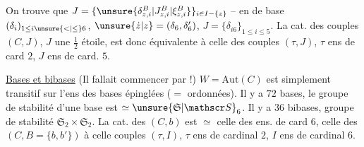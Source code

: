On trouve que $J=\{\unsure{\delta^B_{z,i}|J^B_{z,i}|\xi^B_{z,i}}\}_{i\in I-\{z\}}$ -- en  de base $(\delta_i)_{1\leq i\unsure{<|\leq}6}$, $\unsure{\dot z|z}=(\delta_6,\delta'_6)$, $J=\{\delta_{i6}\}_{1\leq i\leq5}$. La cat. des  couples $(C,J)$, $J$ une $\frac12$ étoile, est donc équivalente à celle des couples $(\tau,J)$, $\tau$ ens de card $2$, $J$ ens de card. $5$.

\uline{Bases et bibases} (Il fallait commencer par !)
$W=\mathrm{Aut}(C)$ est simplement transitif sur l'ens des bases épinglées ($=$ ordonnées). Il y a $72$ bases, le groupe de stabilité d'une base est $\simeq\unsure{\mathfrak S|\mathscr S}_6$. Il y a $36$ bibases, groupe de stabilité $\mathfrak S_2\times\mathfrak S_2$.
La cat. des $(C,b)$ est $\simeq$ celle des ens. de card $6$, celle des $(C,B=\{b,b'\})$ à celle  couples $(\tau,I)$, $\tau$ ens de cardinal $2$, $I$ ens de cardinal $6$.
